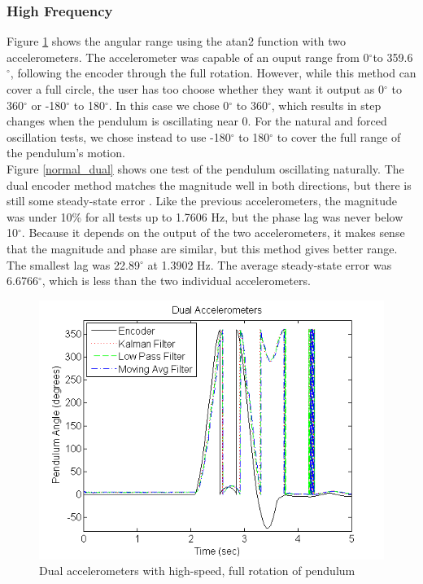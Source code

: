 \documentclass{article}
\theoremstyle{plain}
\theoremstyle{definition}
\theoremstyle{remark}
\begin{document}
\subsubsection{High Frequency}

Figure \ref{full_Dual} shows the angular range using the atan2 function with two accelerometers. The accelerometer was capable of an ouput range from 0$^{\circ}$to 359.6$^{\circ}$, following the encoder through the full rotation. However, while this method can cover a full circle, the user has too choose whether they want it output as 0$^{\circ}$ to 360$^{\circ}$ or -180$^{\circ}$ to 180$^{\circ}$. In this case we chose 0$^{\circ}$ to 360$^{\circ}$, which results in step changes when the pendulum is oscillating near 0. For the natural and forced oscillation tests, we chose instead to use -180$^{\circ}$ to 180$^{\circ}$ to cover the full range of the pendulum's motion. \\

Figure \ref{normal_dual} shows one test of the pendulum oscillating naturally. The dual encoder method matches the magnitude well in both directions, but there is still some steady-state error . Like the previous accelerometers, the magnitude was under 10\% for all tests up to 1.7606 Hz, but the phase lag was never below 10$^{\circ}$. Because it depends on the output of the two accelerometers, it makes sense that the magnitude and phase are similar, but this method gives better range. The smallest lag was 22.89$^{\circ}$ at 1.3902 Hz. The average steady-state error was 6.6766$^{\circ}$, which is less than the two individual accelerometers.\\ 

\begin{figure}[hbt]
\begin{center}
\includegraphics[width = 12cm]{FullRotation_Dual.png}
\caption{Dual accelerometers with high-speed, full rotation of pendulum}
\label{full_Dual}
\end{center}
\end{figure}
\end{document}
